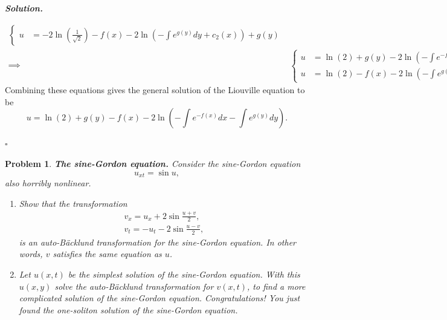 \documentclass[12pt]{report}
\newtheorem{problem}{Problem}
\newenvironment{solution}[1][\it{Solution}]{\textbf{#1. } }{$\square$}
\newcommand{\paren}[1]{{\left(#1\right)}} %
\begin{document}
\begin{solution}
\begin{enumerate}
\begin{align*}
\begin{cases}
                u &=  -2\ln\paren{\frac{1}{\sqrt{2}}} - f(x) - 2\ln\paren{-\int e^{g(y)} dy + c_2(x)} + g(y)
            \end{cases}\\
            \implies &\begin{cases}
                u &= \ln(2) + g(y) -2\ln\paren{-\int e^{-f(x)}dx + c_1(y)} - f(x)\\
                u &=  \ln(2) - f(x) - 2\ln\paren{-\int e^{g(y)} dy + c_2(x)} + g(y)
            \end{cases}.
        \end{align*}
        Combining these equations gives the general solution of the Liouville equation to be
        \[ 
            u = \ln(2) + g(y) - f(x) - 2\ln\paren{-\int e^{-f(x)}dx - \int e^{g(y)}dy}.
        \]


    \end{enumerate}
\end{solution}

\newpage



\begin{problem}
    {\bf The sine-Gordon equation.} Consider the sine-Gordon equation
\[
u_{xt}=\sin u,
\]
also horribly nonlinear.

\begin{enumerate}

\item [a] Show that the transformation
\begin{align*}
v_x=u_x+2\sin \frac{u+v}{2},\\
v_t=-u_t-2\sin \frac{u-v}{2},
\end{align*}
is an {\em auto-B\"acklund transformation} for the sine-Gordon equation. In other words, $v$ satisfies the same equation as $u$.

\item [b] Let $u(x,t)$ be the simplest solution of the sine-Gordon equation. With this $u(x,y)$ solve the auto-B\"acklund transformation for $v(x,t)$, to find a more complicated solution of the sine-Gordon equation. Congratulations! You just found the one-soliton solution of the sine-Gordon equation.
\end{enumerate}

\end{problem}
\end{document}
